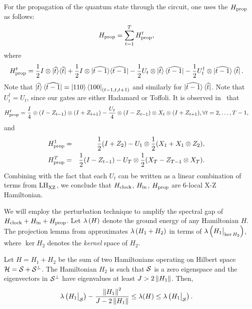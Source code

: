 For the propagation of the quantum state through the circuit, one uses the $H_{\mathrm{prop}}$ as follows:
\begin{equation*} \label{eqn:Hprop}
    H_{\mathrm{prop}}=\sum_{t=1}^T H_{\mathrm{prop}}^t,
\end{equation*}
where
\begin{equation}
    H_{\mathrm{prop}}^t=\frac{1}{2}I\otimes|\widehat{t}\rangle\langle \widehat{t}|
    +\frac{1}{2}I\otimes|\widehat{t-1}\rangle\langle \widehat{t-1}|
    -\frac{1}{2} U_t\otimes\ket{\widehat{t}}\bra{\widehat{t-1}}
    -\frac{1}{2}U_t^\dagger\otimes\ket{\widehat{t-1}}\bra{\widehat{t}}.
\end{equation}
Note that $\ket{\widehat{t}}\bra{\widehat{t-1}}=\ket{110}\bra{100}_{(t-1,t,t+1)}$ and similarly for $\ket{\widehat{t-1}}\bra{\widehat{t}}$.
Note that $U_t^\dagger=U_t$, since our gates are either Hadamard or Toffoli. It is observed in~\cite{PhysRevA.78.012352} that
\begin{equation}
   H_{\mathrm{prop}}^t=\frac{I}{4}\otimes(I-Z_{t-1})\otimes (I+Z_{t+1})-\frac{U_t}{4}\otimes(I-Z_{t-1})\otimes X_t\otimes (I+Z_{t+1}), \forall t=2, \ldots, T-1,
\end{equation}
and
\begin{eqnarray}
  H_{\mathrm{prop}}^1 &= & \frac{1}{2}(I+Z_2)-U_1\otimes\frac{1}{2}(X_1+X_1\otimes Z_2), \\
  H_{\mathrm{prop}}^T &= & \frac{1}{2}(I-Z_{t-1})-U_T\otimes\frac{1}{2}(X_T-Z_{T-1}\otimes X_T).
\end{eqnarray}
Combining with the fact that each $U_t$ can be written as a linear combination of terms from $\mathrm{LH}_{\mathrm{XZ}}^{}$, we conclude that $H_{\mathrm{clock}}$, $H_{\mathrm{in}}$, $H_{\mathrm{prop}}$ are 6-local X-Z Hamiltonian.

We will employ the perturbation technique to amplify the spectral gap of $H_{\mathrm{clock}} + H_{\mathrm{in}} + H_{\mathrm{prop}}$.
Let ${\lambda \left (H \right)}$ denote the ground energy of any Hamiltonian $H$.
The projection lemma from \cite{kempe_kitaev_regev_2006} approximates ${\lambda \left (H_1 + H_2 \right)}$ in terms of ${\lambda \left (H_1\big|_{\ker H_2} \right)}$, where $\ker H_2$ denotes the \emph{kernel} space of $H_2$.

\begin{lem}
    \label{thm:proj1}
    Let $H=H_1+H_2$ be the sum of two Hamiltonians operating on Hilbert space $\mathcal{H}=\mathcal{S}+\mathcal{S}^\bot$.
    The Hamiltonian $H_2$ is such that $\mathcal{S}$ is a zero eigenspace and the eigenvectors in $\mathcal{S}^\bot$ have eigenvalues at least $J>2\left\lVert H_1\right\rVert$. Then,
    $$\lambda\left(H_1\big|_{\mathcal{S}}\right)-\frac{\left\lVert H_1\right\rVert^2}{J-2\left\lVert H_1\right\rVert}\leq\lambda(H)\leq\lambda\left(H_1\big|_{\mathcal{S}}\right).$$
\end{lem}

